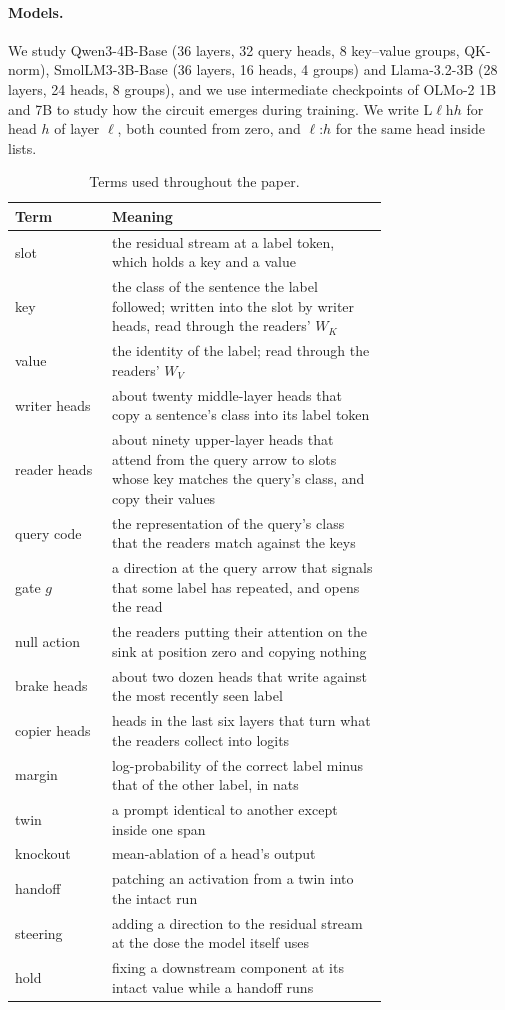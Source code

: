 \documentclass{article}
\begin{document}
\paragraph{Models.} We study Qwen3-4B-Base (36 layers, 32 query heads, 8 key--value groups, QK-norm), SmolLM3-3B-Base (36 layers, 16 heads, 4 groups) and Llama-3.2-3B (28 layers, 24 heads, 8 groups), and we use intermediate checkpoints of OLMo-2 1B and 7B to study how the circuit emerges during training. We write L$\ell$h$h$ for head $h$ of layer $\ell$, both counted from zero, and $\ell$:$h$ for the same head inside lists.

\begin{table}[t]\centering\small
\caption{Terms used throughout the paper.}\label{tab:terms}
\begin{tabular}{@{}lp{0.74\linewidth}@{}}
\toprule
Term & Meaning \\
\midrule
slot & the residual stream at a label token, which holds a key and a value \\
key & the class of the sentence the label followed; written into the slot by writer heads, read through the readers' $W_K$ \\
value & the identity of the label; read through the readers' $W_V$ \\
writer heads & about twenty middle-layer heads that copy a sentence's class into its label token \\
reader heads & about ninety upper-layer heads that attend from the query arrow to slots whose key matches the query's class, and copy their values \\
query code & the representation of the query's class that the readers match against the keys \\
gate $g$ & a direction at the query arrow that signals that some label has repeated, and opens the read \\
null action & the readers putting their attention on the sink at position zero and copying nothing \\
brake heads & about two dozen heads that write against the most recently seen label \\
copier heads & heads in the last six layers that turn what the readers collect into logits \\
\midrule
margin & log-probability of the correct label minus that of the other label, in nats \\
twin & a prompt identical to another except inside one span \\
knockout & mean-ablation of a head's output \\
handoff & patching an activation from a twin into the intact run \\
steering & adding a direction to the residual stream at the dose the model itself uses \\
hold & fixing a downstream component at its intact value while a handoff runs \\
\bottomrule
\end{tabular}
\end{table}
\end{document}
